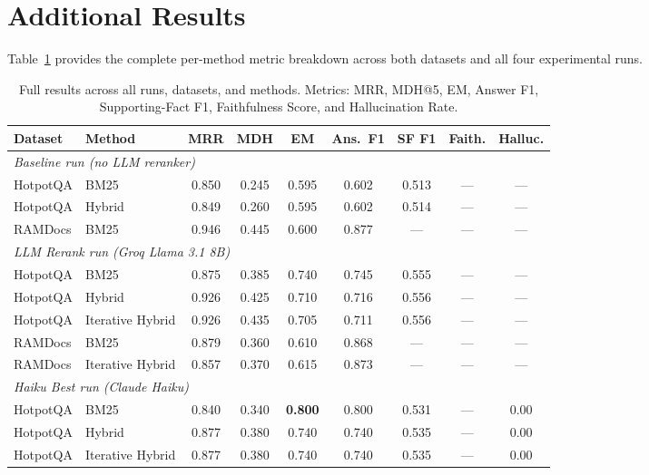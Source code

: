 \documentclass{article}
\begin{document}
\section{Additional Results}
\label{app:full}

Table~\ref{tab:full} provides the complete per-method metric breakdown
across both datasets and all four experimental runs.

\begin{table}[h]
  \caption{Full results across all runs, datasets, and methods.
           Metrics: MRR, MDH@5, EM, Answer F1, Supporting-Fact F1,
           Faithfulness Score, and Hallucination Rate.}
  \label{tab:full}
  \centering
  \scriptsize
  \begin{tabular}{llccccccc}
    \toprule
    Dataset & Method & MRR & MDH & EM & Ans.\ F1 & SF F1 & Faith. & Halluc. \\
    \midrule
    \multicolumn{9}{l}{\textit{Baseline run (no LLM reranker)}} \\
    HotpotQA & BM25    & 0.850 & 0.245 & 0.595 & 0.602 & 0.513 & — & — \\
    HotpotQA & Hybrid  & 0.849 & 0.260 & 0.595 & 0.602 & 0.514 & — & — \\
    RAMDocs  & BM25    & 0.946 & 0.445 & 0.600 & 0.877 & —     & — & — \\
    \midrule
    \multicolumn{9}{l}{\textit{LLM Rerank run (Groq Llama 3.1 8B)}} \\
    HotpotQA & BM25             & 0.875 & 0.385 & 0.740 & 0.745 & 0.555 & — & — \\
    HotpotQA & Hybrid           & 0.926 & 0.425 & 0.710 & 0.716 & 0.556 & — & — \\
    HotpotQA & Iterative Hybrid & 0.926 & 0.435 & 0.705 & 0.711 & 0.556 & — & — \\
    RAMDocs  & BM25             & 0.879 & 0.360 & 0.610 & 0.868 & —     & — & — \\
    RAMDocs  & Iterative Hybrid & 0.857 & 0.370 & 0.615 & 0.873 & —     & — & — \\
    \midrule
    \multicolumn{9}{l}{\textit{Haiku Best run (Claude Haiku)}} \\
    HotpotQA & BM25             & 0.840 & 0.340 & \textbf{0.800} & 0.800 & 0.531 & — & 0.00 \\
    HotpotQA & Hybrid           & 0.877 & 0.380 & 0.740 & 0.740 & 0.535 & — & 0.00 \\
    HotpotQA & Iterative Hybrid & 0.877 & 0.380 & 0.740 & 0.740 & 0.535 & — & 0.00 \\

\end{tabular}
\end{table}
\end{document}
